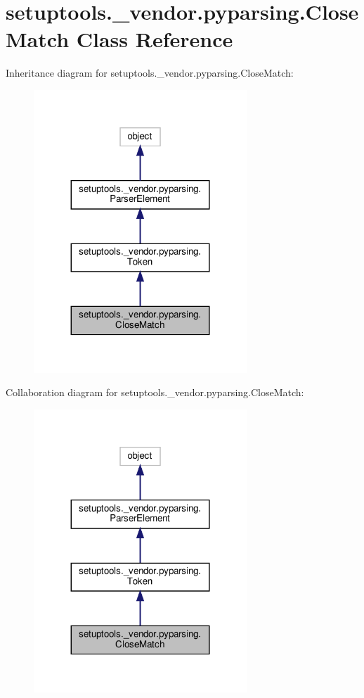 \hypertarget{classsetuptools_1_1__vendor_1_1pyparsing_1_1CloseMatch}{}\section{setuptools.\+\_\+vendor.\+pyparsing.\+Close\+Match Class Reference}
\label{classsetuptools_1_1__vendor_1_1pyparsing_1_1CloseMatch}


Inheritance diagram for setuptools.\+\_\+vendor.\+pyparsing.\+Close\+Match\+:
\nopagebreak
\begin{figure}[H]
\begin{center}
\leavevmode
\includegraphics[width=227pt]{classsetuptools_1_1__vendor_1_1pyparsing_1_1CloseMatch__inherit__graph}
\end{center}
\end{figure}


Collaboration diagram for setuptools.\+\_\+vendor.\+pyparsing.\+Close\+Match\+:
\nopagebreak
\begin{figure}[H]
\begin{center}
\leavevmode
\includegraphics[width=227pt]{classsetuptools_1_1__vendor_1_1pyparsing_1_1CloseMatch__coll__graph}
\end{center}
\end{figure}
